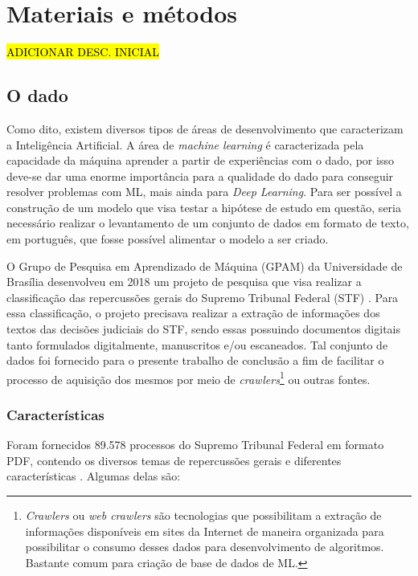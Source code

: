 \chapter[Materiais e métodos]{Materiais e métodos}

\hl{ADICIONAR DESC. INICIAL}

\section{O dado}

Como dito, existem diversos tipos de áreas de desenvolvimento que caracterizam a Inteligência Artificial. A área de \textit{machine learning} é caracterizada pela capacidade da máquina aprender a partir de experiências com o dado, por isso deve-se dar uma enorme importância para a qualidade do dado para conseguir resolver problemas com ML, mais ainda para \textit{Deep Learning}. Para ser possível a construção de um modelo que visa testar a hipótese de estudo em questão, seria necessário realizar o levantamento de um conjunto de dados em formato de texto, em português, que fosse possível alimentar o modelo a ser criado.

O Grupo de Pesquisa em Aprendizado de Máquina (GPAM) da Universidade de Brasília desenvolveu em 2018 um projeto de pesquisa que visa realizar a classificação das repercussões gerais do Supremo Tribunal Federal (STF) \cite{cnn-for-STF}. Para essa classificação, o projeto precisava realizar a extração de informações dos textos das decisões judiciais do STF, sendo essas possuindo documentos digitais tanto formulados digitalmente, manuscritos e/ou escaneados. Tal conjunto de dados foi fornecido para o presente trabalho de conclusão a fim de facilitar o processo de aquisição dos mesmos por meio de \textit{crawlers}\footnote{
  \textit{Crawlers} ou \textit{web crawlers} são tecnologias que possibilitam a extração de informações disponíveis em sites da Internet de maneira organizada para possibilitar o consumo desses dados para desenvolvimento de algoritmos. Bastante comum para criação de base de dados de ML.
} ou outras fontes.

\subsection{Características}

Foram fornecidos 89.578 processos do Supremo Tribunal Federal em formato PDF, contendo os diversos temas de repercussões gerais e diferentes características \cite{cnn-for-STF}. Algumas delas são:

